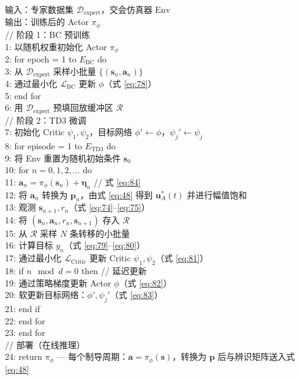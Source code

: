 \begin{algorithm}[H]
\caption{面向制导参数优化的 BC-TD3 离线训练}
\label{alg:bctd3}
{\footnotesize
\raggedright
输入：专家数据集 \(\mathcal{D}_{\text{expert}}\)，交会仿真器 \(\text{Env}\)\\
输出：训练后的 Actor \(\pi_\phi\)\\
// 阶段 1：BC 预训练\\
1: 以随机权重初始化 Actor \(\pi_\phi\)\\
2: for epoch = 1 to \(E_{\text{BC}}\) do\\
3:   从 \(\mathcal{D}_{\text{expert}}\) 采样小批量 \(\{(\boldsymbol{s}_n, \boldsymbol{a}_n)\}\)\\
4:   通过最小化 \(\mathcal{L}_{\text{BC}}\) 更新 \(\phi\)（式 \ref{eq:78}）\\
5: end for\\
6: 用 \(\mathcal{D}_{\text{expert}}\) 预填回放缓冲区 \(\mathcal{R}\)\\
// 阶段 2：TD3 微调\\
7: 初始化 Critic \(\psi_1, \psi_2\)，目标网络 \(\phi' \leftarrow \phi\)，\(\psi_j' \leftarrow \psi_j\)\\
8: for episode = 1 to \(E_{\text{TD3}}\) do\\
9:   将 Env 重置为随机初始条件 \(\boldsymbol{s}_0\)\\
10:  for \(n = 0, 1, 2, \ldots\) do\\
11:    \(\boldsymbol{a}_n = \pi_\phi(\boldsymbol{s}_n) + \boldsymbol{\eta}_n\)                    // 式 \ref{eq:84}\\
12:    将 \(\boldsymbol{a}_n\) 转换为 \(\boldsymbol{p}_n\)，由式 \eqref{eq:48} 得到 \(\boldsymbol{u}_A^*(t)\) 并进行幅值饱和\\
13:    观测 \(\boldsymbol{s}_{n+1}, r_n\)（式 \ref{eq:74}--\ref{eq:75}）\\
14:    将 \((\boldsymbol{s}_n, \boldsymbol{a}_n, r_n, \boldsymbol{s}_{n+1})\) 存入 \(\mathcal{R}\)\\
15:    从 \(\mathcal{R}\) 采样 \(N\) 条转移的小批量\\
16:    计算目标 \(y_n\)（式 \ref{eq:79}--\ref{eq:80}）\\
17:    通过最小化 \(\mathcal{L}_{\text{Critic}}\) 更新 Critic \(\psi_1, \psi_2\)（式 \ref{eq:81}）\\
18:    if \(n \mod d = 0\) then                                           // 延迟更新\\
19:      通过策略梯度更新 Actor \(\phi\)（式 \ref{eq:82}）\\
20:      软更新目标网络：\(\phi', \psi_j'\)（式 \ref{eq:83}）\\
21:    end if\\
22:  end for\\
23: end for\\
// 部署（在线推理）\\
24: return \(\pi_\phi\) — 每个制导周期：\(\boldsymbol{a} = \pi_\phi(\boldsymbol{s})\)，转换为 \(\boldsymbol{p}\) 后与辨识矩阵送入式 \eqref{eq:48}
}
\end{algorithm}
